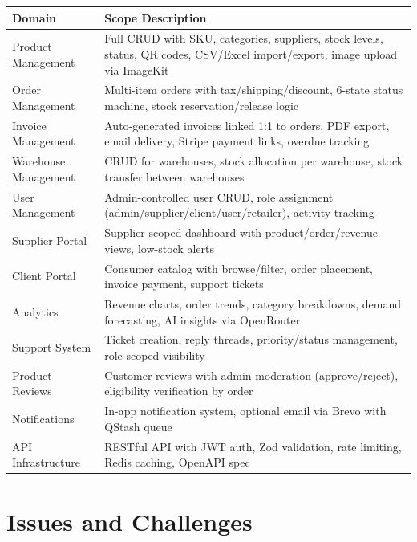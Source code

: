 ﻿\documentclass[12pt,a4paper]{report}
\begin{document}
\begin{center}
\begin{tabularx}{\textwidth}{lX}
  \toprule
  \textbf{Domain} & \textbf{Scope Description} \\
  \midrule
  Product Management    & Full CRUD with SKU, categories, suppliers, stock levels, status, QR codes, CSV/Excel import/export, image upload via ImageKit \\
  Order Management      & Multi-item orders with tax/shipping/discount, 6-state status machine, stock reservation/release logic \\
  Invoice Management    & Auto-generated invoices linked 1:1 to orders, PDF export, email delivery, Stripe payment links, overdue tracking \\
  Warehouse Management  & CRUD for warehouses, stock allocation per warehouse, stock transfer between warehouses \\
  User Management       & Admin-controlled user CRUD, role assignment (admin/supplier/client/user/retailer), activity tracking \\
  Supplier Portal       & Supplier-scoped dashboard with product/order/revenue views, low-stock alerts \\
  Client Portal         & Consumer catalog with browse/filter, order placement, invoice payment, support tickets \\
  Analytics             & Revenue charts, order trends, category breakdowns, demand forecasting, AI insights via OpenRouter \\
  Support System        & Ticket creation, reply threads, priority/status management, role-scoped visibility \\
  Product Reviews       & Customer reviews with admin moderation (approve/reject), eligibility verification by order \\
  Notifications         & In-app notification system, optional email via Brevo with QStash queue \\
  API Infrastructure    & RESTful API with JWT auth, Zod validation, rate limiting, Redis caching, OpenAPI spec \\
  \bottomrule
\end{tabularx}
\end{center}

\section{Issues and Challenges}
\end{document}
